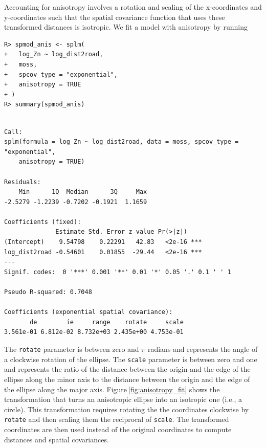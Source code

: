\documentclass{article}
\begin{document}
Accounting for anisotropy involves a rotation and scaling of the
x-coordinates and y-coordinates such that the spatial covariance
function that uses these transformed distances is isotropic. We fit a
model with anisotropy by running

\begin{verbatim}
R> spmod_anis <- splm(
+   log_Zn ~ log_dist2road,
+   moss,
+   spcov_type = "exponential",
+   anisotropy = TRUE
+ )
R> summary(spmod_anis)
\end{verbatim}

\begin{verbatim}

Call:
splm(formula = log_Zn ~ log_dist2road, data = moss, spcov_type = "exponential", 
    anisotropy = TRUE)

Residuals:
    Min      1Q  Median      3Q     Max 
-2.5279 -1.2239 -0.7202 -0.1921  1.1659 

Coefficients (fixed):
              Estimate Std. Error z value Pr(>|z|)    
(Intercept)    9.54798    0.22291   42.83   <2e-16 ***
log_dist2road -0.54601    0.01855  -29.44   <2e-16 ***
---
Signif. codes:  0 '***' 0.001 '**' 0.01 '*' 0.05 '.' 0.1 ' ' 1

Pseudo R-squared: 0.7048

Coefficients (exponential spatial covariance):
       de        ie     range    rotate     scale 
3.561e-01 6.812e-02 8.732e+03 2.435e+00 4.753e-01 
\end{verbatim}

The \texttt{rotate} parameter is between zero and \(\pi\) radians and
represents the angle of a clockwise rotation of the ellipse. The
\texttt{scale} parameter is between zero and one and represents the
ratio of the distance between the origin and the edge of the ellipse
along the minor axis to the distance between the origin and the edge of
the ellipse along the major axis. Figure\(~\)\ref{fig:anisotropy_fit}
shows the transformation that turns an anisotropic ellipse into an
isotropic one (i.e., a circle). This transformation requires rotating
the the coordinates clockwise by \texttt{rotate} and then scaling them
the reciprocal of \texttt{scale}. The transformed coordinates are then
used instead of the original coordinates to compute distances and
spatial covariances.
\end{document}
